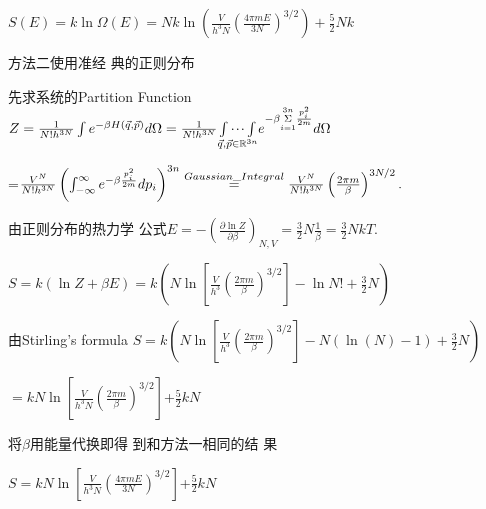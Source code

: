 \documentclass{ctexart}
\def\NEG#1{\mathbb{#1}}
\begin{document}
$S\left( E\right) =k\ln \Omega \left( E\right) =Nk\ln \left( \frac{V}{h^{3}N}%
\left( \frac{4\pi mE}{3N}\right) ^{3/2}\right) +\frac{5}{2}Nk$

\bigskip 方法二\qquad 使用准经%
典的正则分布

先求系统的Partition Function $Z=\frac{1}{%
N!h^{3N}}\int e^{-\beta H\left( \vec{q},\vec{p}\right) }d\Omega =\frac{1}{%
N!h^{3N}}\underset{\vec{q},\vec{p}\in \NEG{R}^{3n}}{\idotsint }e^{-\beta 
\underset{i=1}{\overset{3n}{\Sigma }}\frac{p_{i}^{2}}{2m}}d\Omega $

=$\frac{V^{N}}{N!h^{3N}}\left( \int_{-\infty }^{\infty }e^{-\beta \frac{%
p_{i}^{2}}{2m}}dp_{i}\right) ^{3n}\overset{Gaussian\_Integral}{=}\frac{V^{N}%
}{N!h^{3N}}\left( \frac{2\pi m}{\beta }\right) ^{3N/2}.$

由正则分布的热力学%
公式\qquad $E=-\left( \frac{\partial \ln Z}{\partial \beta }%
\right) _{N,V}=\frac{3}{2}N\frac{1}{\beta }=\frac{3}{2}NkT.$

$S=k\left( \ln Z+\beta E\right) =k\left( N\ln \left[ \frac{V}{h^{3}}\left( 
\frac{2\pi m}{\beta }\right) ^{3/2}\right] -\ln N!+\frac{3}{2}N\right) $

由Stirling's formula $S=k\left( N\ln \left[ \frac{V}{h^{3}}\left( 
\frac{2\pi m}{\beta }\right) ^{3/2}\right] -N\left( \ln \left( N\right)
-1\right) +\frac{3}{2}N\right) $

$=kN\ln \left[ \frac{V}{h^{3}N}\left( \frac{2\pi m}{\beta }\right) ^{3/2}%
\right] $+$\frac{5}{2}kN$

将$\beta $用能量代换即得%
到和方法一相同的结%
果

$S=kN\ln \left[ \frac{V}{h^{3}N}\left( \frac{4\pi mE}{3N}\right) ^{3/2}%
\right] $+$\frac{5}{2}kN$

\bigskip
\end{document}
